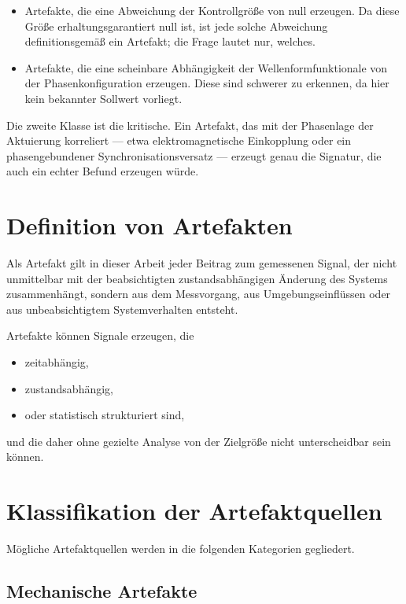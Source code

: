 \documentclass[12pt,a4paper]{report}
\begin{document}
\begin{itemize}
\item Artefakte, die eine Abweichung der Kontrollgröße von null
      erzeugen. Da diese Größe erhaltungsgarantiert null ist, ist jede
      solche Abweichung definitionsgemäß ein Artefakt; die Frage lautet
      nur, welches.
\item Artefakte, die eine scheinbare Abhängigkeit der
      Wellenformfunktionale von der Phasenkonfiguration erzeugen. Diese
      sind schwerer zu erkennen, da hier kein bekannter Sollwert
      vorliegt.
\end{itemize}

Die zweite Klasse ist die kritische. Ein Artefakt, das mit der
Phasenlage der Aktuierung korreliert --- etwa elektromagnetische
Einkopplung oder ein phasengebundener Synchronisationsversatz ---
erzeugt genau die Signatur, die auch ein echter Befund erzeugen würde.

\section{Definition von Artefakten}

Als Artefakt gilt in dieser Arbeit jeder Beitrag zum gemessenen Signal,
der nicht unmittelbar mit der beabsichtigten zustandsabhängigen
Änderung des Systems zusammenhängt, sondern aus dem Messvorgang, aus
Umgebungseinflüssen oder aus unbeabsichtigtem Systemverhalten entsteht.

Artefakte können Signale erzeugen, die

\begin{itemize}
\item zeitabhängig,
\item zustandsabhängig,
\item oder statistisch strukturiert sind,
\end{itemize}

und die daher ohne gezielte Analyse von der Zielgröße nicht
unterscheidbar sein können.

\section{Klassifikation der Artefaktquellen}

Mögliche Artefaktquellen werden in die folgenden Kategorien gegliedert.

\subsection{Mechanische Artefakte}
\end{document}
